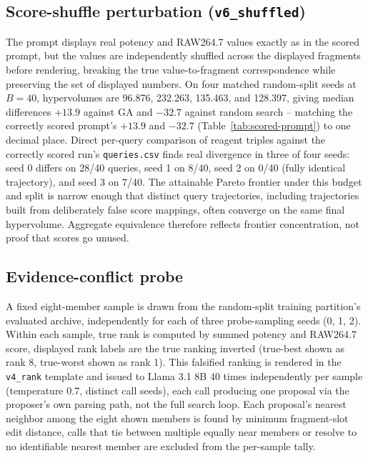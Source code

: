 \subsection{Score-shuffle perturbation (\texttt{v6\_shuffled})}
\label{app:shuffle}
The prompt displays real potency and RAW264.7 values exactly as in the scored prompt, but the values are independently shuffled across the displayed fragments before rendering, breaking the true value-to-fragment correspondence while preserving the set of displayed numbers. On four matched random-split seeds at $B=40$, hypervolumes are 96.876, 232.263, 135.463, and 128.397, giving median differences $+13.9$ against GA and $-32.7$ against random search -- matching the correctly scored prompt's $+13.9$ and $-32.7$ (Table~\ref{tab:scored-prompt}) to one decimal place. Direct per-query comparison of reagent triples against the correctly scored run's \texttt{queries.csv} finds real divergence in three of four seeds: seed 0 differs on 28/40 queries, seed 1 on 8/40, seed 2 on 0/40 (fully identical trajectory), and seed 3 on 7/40. The attainable Pareto frontier under this budget and split is narrow enough that distinct query trajectories, including trajectories built from deliberately false score mappings, often converge on the same final hypervolume. Aggregate equivalence therefore reflects frontier concentration, not proof that scores go unused.

\subsection{Evidence-conflict probe}
\label{app:conflict}
A fixed eight-member sample is drawn from the random-split training partition's evaluated archive, independently for each of three probe-sampling seeds (0, 1, 2). Within each sample, true rank is computed by summed potency and RAW264.7 score, displayed rank labels are the true ranking inverted (true-best shown as rank 8, true-worst shown as rank 1). This falsified ranking is rendered in the \texttt{v4\_rank} template and issued to Llama 3.1 8B 40 times independently per sample (temperature 0.7, distinct call seeds), each call producing one proposal via the proposer's own parsing path, not the full search loop. Each proposal's nearest neighbor among the eight shown members is found by minimum fragment-slot edit distance, calls that tie between multiple equally near members or resolve to no identifiable nearest member are excluded from the per-sample tally.

